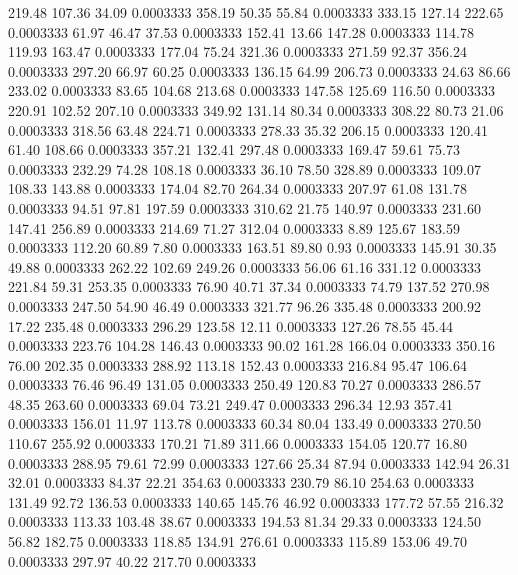  219.48  107.36   34.09   0.0003333
 358.19   50.35   55.84   0.0003333
 333.15  127.14  222.65   0.0003333
  61.97   46.47   37.53   0.0003333
 152.41   13.66  147.28   0.0003333
 114.78  119.93  163.47   0.0003333
 177.04   75.24  321.36   0.0003333
 271.59   92.37  356.24   0.0003333
 297.20   66.97   60.25   0.0003333
 136.15   64.99  206.73   0.0003333
  24.63   86.66  233.02   0.0003333
  83.65  104.68  213.68   0.0003333
 147.58  125.69  116.50   0.0003333
 220.91  102.52  207.10   0.0003333
 349.92  131.14   80.34   0.0003333
 308.22   80.73   21.06   0.0003333
 318.56   63.48  224.71   0.0003333
 278.33   35.32  206.15   0.0003333
 120.41   61.40  108.66   0.0003333
 357.21  132.41  297.48   0.0003333
 169.47   59.61   75.73   0.0003333
 232.29   74.28  108.18   0.0003333
  36.10   78.50  328.89   0.0003333
 109.07  108.33  143.88   0.0003333
 174.04   82.70  264.34   0.0003333
 207.97   61.08  131.78   0.0003333
  94.51   97.81  197.59   0.0003333
 310.62   21.75  140.97   0.0003333
 231.60  147.41  256.89   0.0003333
 214.69   71.27  312.04   0.0003333
   8.89  125.67  183.59   0.0003333
 112.20   60.89    7.80   0.0003333
 163.51   89.80    0.93   0.0003333
 145.91   30.35   49.88   0.0003333
 262.22  102.69  249.26   0.0003333
  56.06   61.16  331.12   0.0003333
 221.84   59.31  253.35   0.0003333
  76.90   40.71   37.34   0.0003333
  74.79  137.52  270.98   0.0003333
 247.50   54.90   46.49   0.0003333
 321.77   96.26  335.48   0.0003333
 200.92   17.22  235.48   0.0003333
 296.29  123.58   12.11   0.0003333
 127.26   78.55   45.44   0.0003333
 223.76  104.28  146.43   0.0003333
  90.02  161.28  166.04   0.0003333
 350.16   76.00  202.35   0.0003333
 288.92  113.18  152.43   0.0003333
 216.84   95.47  106.64   0.0003333
  76.46   96.49  131.05   0.0003333
 250.49  120.83   70.27   0.0003333
 286.57   48.35  263.60   0.0003333
  69.04   73.21  249.47   0.0003333
 296.34   12.93  357.41   0.0003333
 156.01   11.97  113.78   0.0003333
  60.34   80.04  133.49   0.0003333
 270.50  110.67  255.92   0.0003333
 170.21   71.89  311.66   0.0003333
 154.05  120.77   16.80   0.0003333
 288.95   79.61   72.99   0.0003333
 127.66   25.34   87.94   0.0003333
 142.94   26.31   32.01   0.0003333
  84.37   22.21  354.63   0.0003333
 230.79   86.10  254.63   0.0003333
 131.49   92.72  136.53   0.0003333
 140.65  145.76   46.92   0.0003333
 177.72   57.55  216.32   0.0003333
 113.33  103.48   38.67   0.0003333
 194.53   81.34   29.33   0.0003333
 124.50   56.82  182.75   0.0003333
 118.85  134.91  276.61   0.0003333
 115.89  153.06   49.70   0.0003333
 297.97   40.22  217.70   0.0003333
